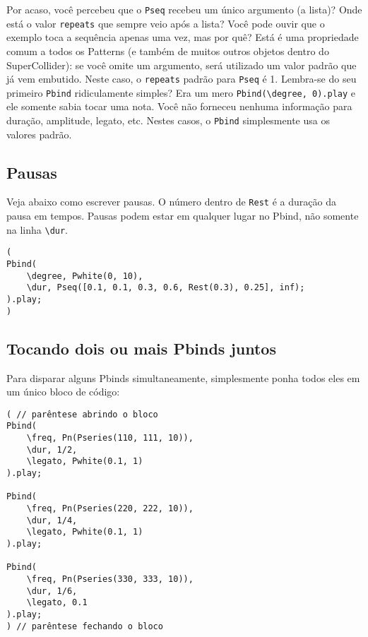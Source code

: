 Por acaso, você percebeu que o \texttt{Pseq} recebeu um único argumento (a lista)? Onde está o valor \texttt{repeats} que sempre veio após a lista? Você pode ouvir que o exemplo toca a sequência apenas uma vez, mas por quê? Está é uma propriedade comum a todos os Patterns (e também de muitos outros objetos dentro do SuperCollider): se você omite um argumento, será utilizado um valor padrão que já vem embutido. Neste caso, o \texttt{repeats} padrão para \texttt{Pseq} é 1. Lembra-se do seu primeiro \texttt{Pbind} ridiculamente simples? Era um mero \texttt{Pbind(\textbackslash degree, 0).play} e ele somente sabia tocar uma nota. Você não forneceu nenhuma informação para duração, amplitude, legato, etc. Nestes casos, o \texttt{Pbind} simplesmente usa os valores padrão.


\subsection{Pausas}

Veja abaixo como escrever pausas. O número dentro de \texttt{Rest} é a duração da pausa em tempos. Pausas podem estar em qualquer lugar no Pbind, não somente na linha \texttt{\textbackslash dur}.

 
\begin{lstlisting}[style=SuperCollider-IDE, basicstyle=\scttfamily\footnotesize]
(
Pbind(
	\degree, Pwhite(0, 10),
	\dur, Pseq([0.1, 0.1, 0.3, 0.6, Rest(0.3), 0.25], inf);
).play;
)
\end{lstlisting}
 

\subsection{Tocando dois ou mais Pbinds juntos}

Para disparar alguns Pbinds simultaneamente, simplesmente ponha todos eles em um único bloco de código:
 
\begin{lstlisting}[style=SuperCollider-IDE, basicstyle=\scttfamily\footnotesize]
( // parêntese abrindo o bloco
Pbind(
	\freq, Pn(Pseries(110, 111, 10)),
	\dur, 1/2,
	\legato, Pwhite(0.1, 1)
).play;

Pbind(
	\freq, Pn(Pseries(220, 222, 10)),
	\dur, 1/4,
	\legato, Pwhite(0.1, 1)
).play;

Pbind(
	\freq, Pn(Pseries(330, 333, 10)),
	\dur, 1/6,
	\legato, 0.1
).play;
) // parêntese fechando o bloco
\end{lstlisting}

